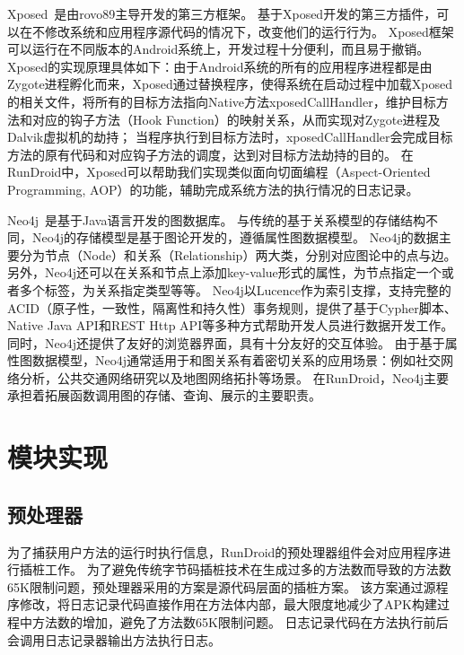 Xposed~\cite{Xposed}是由rovo89主导开发的第三方框架。
基于Xposed开发的第三方插件，可以在不修改系统和应用程序源代码的情况下，改变他们的运行行为。
Xposed框架可以运行在不同版本的Android系统上，开发过程十分便利，而且易于撤销。
Xposed的实现原理具体如下：由于Android系统的所有的应用程序进程都是由Zygote进程孵化而来，Xposed通过替换程序，使得系统在启动过程中加载Xposed的相关文件，将所有的目标方法指向Native方法xposedCallHandler，维护目标方法和对应的钩子方法（Hook Function）的映射关系，从而实现对Zygote进程及Dalvik虚拟机的劫持；
当程序执行到目标方法时，xposedCallHandler会完成目标方法的原有代码和对应钩子方法的调度，达到对目标方法劫持的目的。
在RunDroid中，Xposed可以帮助我们实现类似面向切面编程（Aspect-Oriented Programming, AOP）的功能，辅助完成系统方法的执行情况的日志记录。

Neo4j~\cite{Neo4jthe19}是基于Java语言开发的图数据库。
与传统的基于关系模型的存储结构不同，Neo4j的存储模型是基于图论开发的，遵循属性图数据模型。
Neo4j的数据主要分为节点（Node）和关系（Relationship）两大类，分别对应图论中的点与边。
另外，Neo4j还可以在关系和节点上添加key-value形式的属性，为节点指定一个或者多个标签，为关系指定类型等等。
Neo4j以Lucence作为索引支撑，支持完整的 ACID（原子性，一致性，隔离性和持久性）事务规则，提供了基于Cypher脚本、Native Java API和REST Http API等多种方式帮助开发人员进行数据开发工作。
同时，Neo4j还提供了友好的浏览器界面，具有十分友好的交互体验。
由于基于属性图数据模型，Neo4j通常适用于和图关系有着密切关系的应用场景：例如社交网络分析，公共交通网络研究以及地图网络拓扑等场景。
在RunDroid，Neo4j主要承担着拓展函数调用图的存储、查询、展示的主要职责。

\section{模块实现}


\subsection{预处理器}

为了捕获用户方法的运行时执行信息，RunDroid的预处理器组件会对应用程序进行插桩工作。
为了避免传统字节码插桩技术在生成过多的方法数而导致的方法数65K限制问题，预处理器采用的方案是源代码层面的插桩方案。
该方案通过源程序修改，将日志记录代码直接作用在方法体内部，最大限度地减少了APK构建过程中方法数的增加，避免了方法数65K限制问题。
日志记录代码在方法执行前后会调用日志记录器输出方法执行日志。


